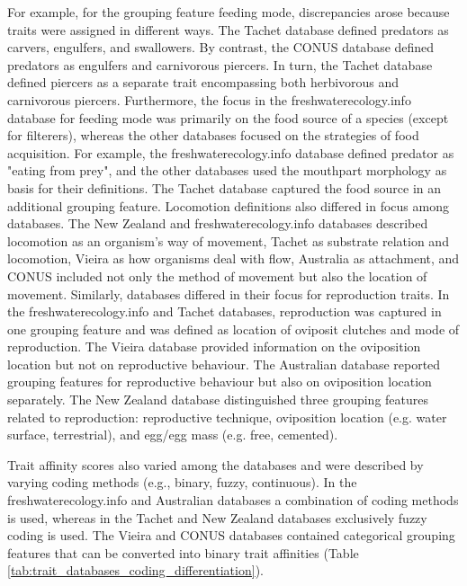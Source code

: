 \documentclass{article}
\begin{document}
For example, for the grouping feature feeding mode, discrepancies arose because traits were assigned in different ways. The Tachet database defined predators as carvers, engulfers, and swallowers. By contrast, the CONUS database defined predators as engulfers and carnivorous piercers. In turn, the Tachet database defined piercers as a separate trait encompassing both herbivorous and carnivorous piercers. Furthermore, the focus in the freshwaterecology.info database for feeding mode was primarily on the food source of a species (except for filterers), whereas the other databases focused on the strategies of food acquisition. For example, the freshwaterecology.info database defined predator as "eating from prey", and the other databases used the mouthpart morphology as basis for their definitions. The Tachet database captured the food source in an additional grouping feature. Locomotion definitions also differed in focus among databases. The New Zealand and freshwaterecology.info databases described locomotion as an organism’s way of movement, Tachet as substrate relation and locomotion, Vieira as how organisms deal with flow, Australia as attachment, and CONUS included not only the method of movement but also the location of movement. Similarly, databases differed in their focus for reproduction traits. In the freshwaterecology.info and Tachet databases, reproduction was captured in one grouping feature and was defined as location of oviposit clutches and mode of reproduction. The Vieira database provided information on the oviposition location but not on reproductive behaviour. The Australian database reported grouping features for reproductive behaviour but also on oviposition location separately. The New Zealand database distinguished three grouping features related to reproduction: reproductive technique, oviposition location (e.g. water surface, terrestrial), and egg/egg mass (e.g. free, cemented).

Trait affinity scores also varied among the databases and were described by varying coding methods (e.g., binary, fuzzy, continuous). In the freshwaterecology.info and Australian databases a combination of coding methods is used, whereas in the Tachet and New Zealand databases exclusively fuzzy coding is used. The Vieira and CONUS databases contained categorical grouping features that can be converted into binary trait affinities (Table \ref{tab:trait_databases_coding_differentiation}).
\end{document}
